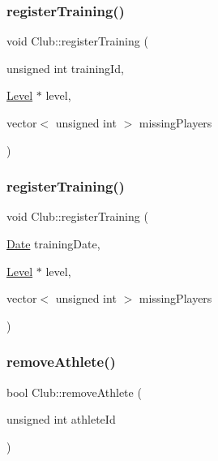 \hypertarget{class_club_ab980545f4b4236481268705d9d965f13}{}\label{class_club_ab980545f4b4236481268705d9d965f13} 
\subsubsection{\texorpdfstring{register\+Training()}{registerTraining()}\hspace{0.1cm}{\footnotesize\ttfamily [1/2]}}
{\footnotesize\ttfamily void Club\+::register\+Training (\begin{DoxyParamCaption}\item[{unsigned int}]{training\+Id,  }\item[{\hyperlink{class_level}{Level} $\ast$}]{level,  }\item[{vector$<$ unsigned int $>$}]{missing\+Players }\end{DoxyParamCaption})}

\hypertarget{class_club_a0085b30f629ff1ca45090738ecaba5b7}{}\label{class_club_a0085b30f629ff1ca45090738ecaba5b7} 
\subsubsection{\texorpdfstring{register\+Training()}{registerTraining()}\hspace{0.1cm}{\footnotesize\ttfamily [2/2]}}
{\footnotesize\ttfamily void Club\+::register\+Training (\begin{DoxyParamCaption}\item[{\hyperlink{class_date}{Date}}]{training\+Date,  }\item[{\hyperlink{class_level}{Level} $\ast$}]{level,  }\item[{vector$<$ unsigned int $>$}]{missing\+Players }\end{DoxyParamCaption})}

\hypertarget{class_club_a0ba1e1dd655c3866111476aed700a7ac}{}\label{class_club_a0ba1e1dd655c3866111476aed700a7ac} 
\subsubsection{\texorpdfstring{remove\+Athlete()}{removeAthlete()}}
{\footnotesize\ttfamily bool Club\+::remove\+Athlete (\begin{DoxyParamCaption}\item[{unsigned int}]{athlete\+Id }\end{DoxyParamCaption})}



